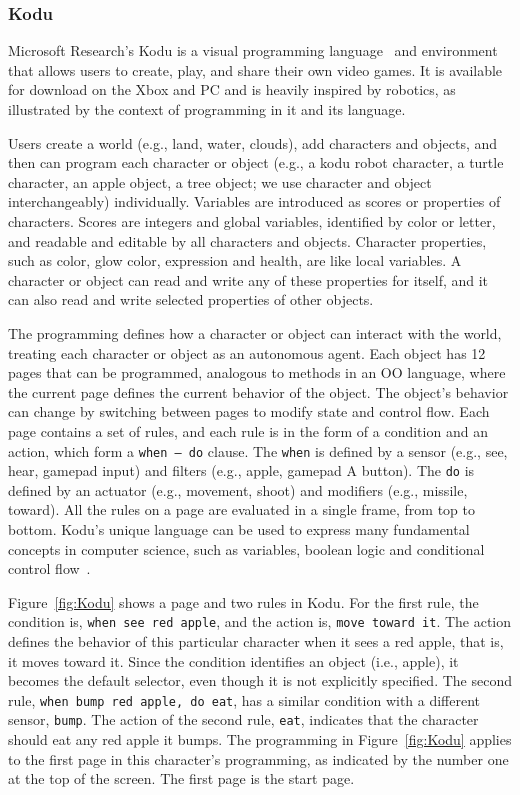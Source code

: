 \documentclass[conference]{IEEEtran}
\begin{document}
\subsubsection{Kodu}
Microsoft Research's Kodu is a visual programming language~\cite{kodugrammar} and environment that allows users to create, play, and share their own video games. 
It is available for download on the Xbox and PC and is heavily inspired by robotics, as illustrated by the context of programming in it and its language. 


Users create a world (e.g., land, water, clouds),  add characters and objects, and then can program each character or object (e.g., a kodu robot character, a turtle character, an apple object, a tree object; we use character and object interchangeably) individually. Variables are introduced as scores or properties of characters. Scores are integers and global variables, identified by color or letter, and readable and editable by all characters and objects. Character properties, such as color, glow color, expression and health, are like local variables. A character or object can read and write any of these properties for itself, and it can also read and write selected properties of other objects. 

The programming defines how a character or object can interact with the world, treating each character or object as an autonomous agent. Each object has 12 pages that can be programmed, analogous to methods in an OO language, where the current page defines the current behavior of the object. 
The object's behavior can change by switching between pages to modify state and control flow. 
Each page contains a set of rules, and each rule is in the form of a condition and an action, which form a {\tt when~--~do} clause. The {\tt when} is defined by a sensor (e.g., see, hear, gamepad input) and filters (e.g., apple, gamepad A button). The {\tt do} is defined by an actuator (e.g., movement, shoot) and modifiers (e.g., missile, toward). All the rules on a page are evaluated in a single frame, from top to bottom. 
Kodu's unique language  can be used to express many fundamental concepts in computer science, such as variables, boolean logic and conditional control flow~\cite{Stolee:2011:ECS:1953163.1953197}. 

Figure~\ref{fig:Kodu} shows a page and two rules  in Kodu. For the first rule, the condition is, {\tt when see red apple}, and the action is, {\tt move toward it}. The action defines the behavior of this particular character when it sees a red apple, that is, it moves toward it. Since the condition identifies an object (i.e., apple), it becomes the default selector, even though it is not explicitly specified. The second rule, {\tt when bump red apple, do eat}, has a similar condition with a different sensor, {\tt bump}. The action of the second rule, {\tt eat}, indicates that the character should eat any red apple it bumps. 
The programming in Figure~\ref{fig:Kodu} applies to the first page in this character's programming, as indicated by the number one at the top of the screen. The first page is the  start page.
\end{document}
